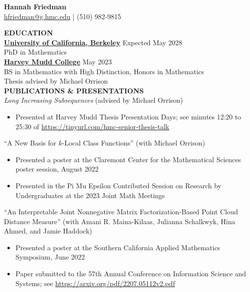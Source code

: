 \documentclass[11pt]{article}
\newcommand{\hdr}[1]{\textcolor{blue(ryb)}{\textbf{#1}}}
\begin{document}
\begin{center}
\hdr{\Large{Hannah Friedman}}\\
\url{hfriedman@g.hmc.edu} | (510) 982-9815\\
\end{center}
\medskip
\raggedright
\hdr{EDUCATION}\\
\textbf{\underline{University of California, Berkeley}} \hfill Expected May 2028\\
PhD in Mathematics\\
\textbf{\underline{Harvey Mudd College}} \hfill May 2023\\
BS in Mathematics with High Distinction, Honors in Mathematics\\
Thesis advised by Michael Orrison\\
\bigskip
\hdr{PUBLICATIONS \& PRESENTATIONS}\\
\textit{Long Increasing Subsequences} (advised by Michael Orrison)
\begin{itemize}
\item Presented at Harvey Mudd Thesis Presentation Days; see minutes 12:20 to 25:30 of \url{https://tinyurl.com/hmc-senior-thesis-talk} 
\end{itemize}
``A New Basis for $k$-Local Class Functions'' (with Michael Orrison)
\begin{itemize}
\item Presented a poster at the Claremont Center for the Mathematical Sciences poster session, August 2022
\item Presented in the Pi Mu Epsilon Contributed Session on Research by Undergraduates at the 2023 Joint Math Meetings
\end{itemize}
\smallskip
``An Interpretable Joint Nonnegative Matrix Factorization-Based Point Cloud Distance Measure'' (with Amani R. Maina-Kilaas, Julianna Schalkwyk, Hina Ahmed, and Jamie Haddock)
\begin{itemize}
\item Presented a poster at the Southern California Applied Mathematics Symposium, June 2022
\item Paper submitted to the 57th Annual Conference on Information Science and Systems; see \url{https://arxiv.org/pdf/2207.05112v2.pdf}
\end{itemize}
\end{document}
